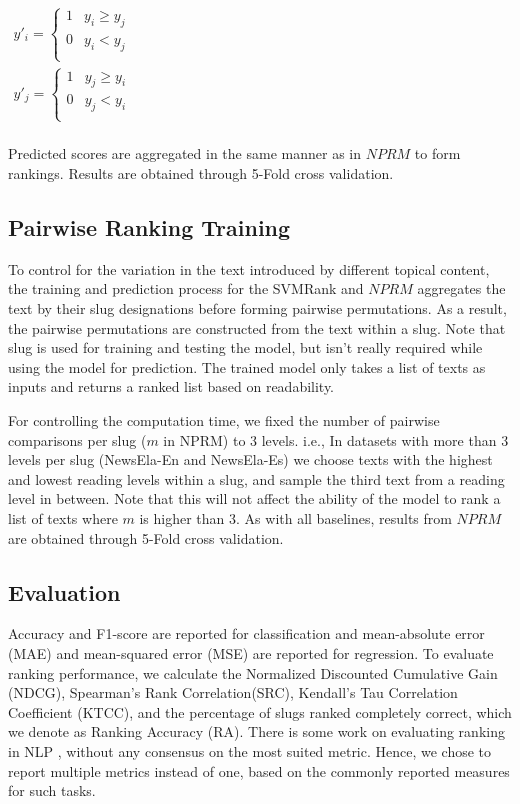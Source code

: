 \documentclass[11pt]{article}
\begin{document}
{\centering
  $ \displaystyle
\begin{aligned}
    y'_i = \begin{cases} 
                1 & y_i\geq y_j \\
                0 & y_i < y_j  \\
            \end{cases}\\
    y'_j = \begin{cases} 
                1 & y_j\geq y_i \\
                0 & y_j < y_i  \\
            \end{cases}\\
\end{aligned}
 $ 
\par}
Predicted scores are aggregated in the same manner as in $NPRM$ to form rankings.  Results are obtained through 5-Fold cross validation.

\subsection{Pairwise Ranking Training}
To control for the variation in the text introduced by different topical content, the training and prediction process for the SVMRank and $NPRM$ aggregates the text by their slug designations before forming pairwise permutations. As a result, the pairwise permutations are constructed from the text within a slug. Note that slug is used for training and testing the model, but isn't really required while using the model for prediction. The trained model only takes a list of texts as inputs and returns a ranked list based on readability.

For controlling the computation time, we fixed the number of pairwise comparisons per slug ($m$ in NPRM) to 3 levels. i.e., In datasets with more than 3 levels per slug (NewsEla-En and NewsEla-Es) we choose texts with the highest and lowest reading levels within a slug, and sample the third text from a reading level in between. Note that this will not affect the ability of the model to rank a list of texts where $m$ is higher than 3. As with all baselines, results from $NPRM$ are obtained through 5-Fold cross validation.

\subsection{Evaluation}
Accuracy and F1-score are reported for classification and mean-absolute error (MAE) and mean-squared error (MSE) are reported for regression. To evaluate ranking performance, we calculate the Normalized Discounted Cumulative Gain (NDCG), Spearman's Rank Correlation(SRC), Kendall's Tau Correlation Coefficient (KTCC), and the percentage of slugs ranked completely correct, which we denote as Ranking Accuracy (RA). There is some work on evaluating ranking in NLP \cite{Lapata-06,Katerenchuk.Rosenberg-16}, without any consensus on the most suited metric. Hence, we chose to report multiple metrics instead of one, based on the commonly reported measures for such tasks.
\end{document}
